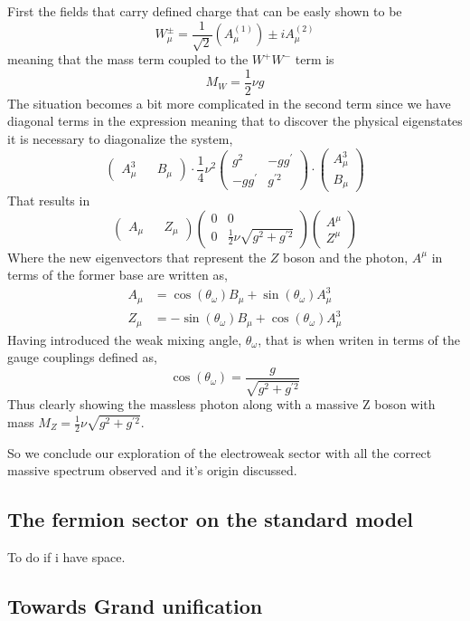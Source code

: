 \documentclass[11pt,twoside,a4paper]{article}
\begin{document}
First the fields that carry defined charge that can be easly shown to be 
\begin{equation}
W^\pm_\mu = \frac{1}{\sqrt{2}} (A^{(1)}_\mu) \pm i A^{(2)}_\mu
\end{equation}
meaning that the mass term coupled to the $W^+ W^-$ term is 
\begin{equation}
M_W= \frac{1}{2}\nu g
\end{equation}
The situation becomes a bit more complicated in the second term since we have diagonal terms in the expression meaning that to discover the physical eigenstates it is necessary to diagonalize the  system, 
\begin{equation}
\begin{pmatrix}
A_\mu^3 && B_\mu
\end{pmatrix} \cdot  \frac{1}{4} \nu ^2 \begin{pmatrix}
g^2  & -g g^\prime \\
-g g^\prime & g^{\prime 2} 
\end{pmatrix} \cdot \begin{pmatrix}
A_\mu^3 \\  B_\mu
\end{pmatrix} 
\end{equation}
That results in 
\begin{equation}
\begin{pmatrix}
A_\mu && Z_\mu 
\end{pmatrix} \begin{pmatrix}
0  & 0 \\
0  & \frac{1}{2} \nu \sqrt{g^2 + g^{\prime 2}} 
\end{pmatrix}  \begin{pmatrix}
A^\mu \\ Z^\mu
\end{pmatrix} 
\end{equation}
Where the new eigenvectors that represent the $Z$ boson and the photon, $A^\mu$ in terms of the former base are written as,
\begin{align}
A_\mu &=\cos(\theta_\omega) B_\mu + \sin(\theta_\omega) A_\mu^3 \\ 
Z_\mu & =- \sin(\theta_\omega) B_\mu + \cos(\theta_\omega) A_\mu^3
\end{align}
Having introduced the weak mixing angle, $ \theta_\omega$, that is when writen in terms of the gauge couplings defined as, 
\begin{equation}
\cos(\theta_\omega)=\frac{g}{ \sqrt{g^2 + g^{\prime 2} }}
\end{equation}
Thus clearly showing the massless photon along with a massive Z boson with mass $M_Z= \frac{1}{2} \nu \sqrt{g^2 + g^{\prime 2}} $. 

So we conclude our exploration of the electroweak sector with all the correct massive spectrum observed and it's origin discussed.
\subsection{The fermion sector on the standard model}
To do if i have space. 
\subsection{Towards Grand unification}
\end{document}
